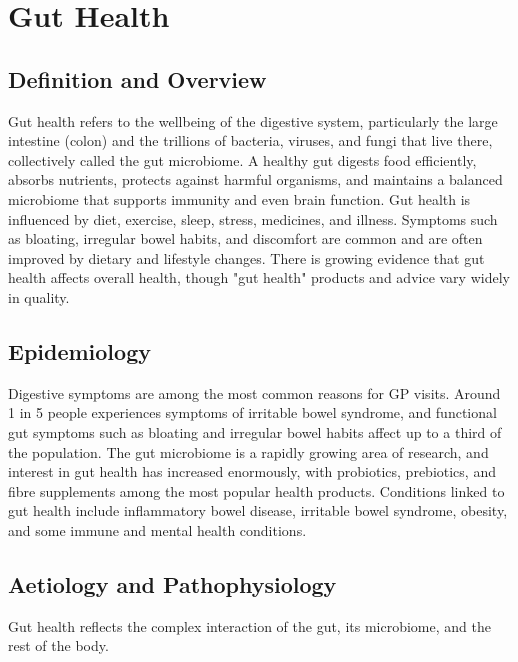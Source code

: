\chapter{Gut Health}

\section*{Definition and Overview}
Gut health refers to the wellbeing of the digestive system, particularly the large intestine (colon) and the trillions of bacteria, viruses, and fungi that live there, collectively called the gut microbiome. A healthy gut digests food efficiently, absorbs nutrients, protects against harmful organisms, and maintains a balanced microbiome that supports immunity and even brain function. Gut health is influenced by diet, exercise, sleep, stress, medicines, and illness. Symptoms such as bloating, irregular bowel habits, and discomfort are common and are often improved by dietary and lifestyle changes. There is growing evidence that gut health affects overall health, though "gut health" products and advice vary widely in quality.

\section*{Epidemiology}
Digestive symptoms are among the most common reasons for GP visits. Around 1 in 5 people experiences symptoms of irritable bowel syndrome, and functional gut symptoms such as bloating and irregular bowel habits affect up to a third of the population. The gut microbiome is a rapidly growing area of research, and interest in gut health has increased enormously, with probiotics, prebiotics, and fibre supplements among the most popular health products. Conditions linked to gut health include inflammatory bowel disease, irritable bowel syndrome, obesity, and some immune and mental health conditions.

\section*{Aetiology and Pathophysiology}
Gut health reflects the complex interaction of the gut, its microbiome, and the rest of the body.

